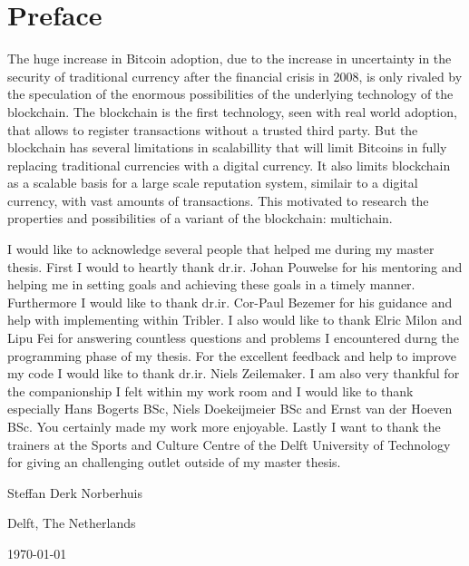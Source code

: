 \chapter*{Preface}
The huge increase in Bitcoin adoption, 
due to the increase in uncertainty in the security of traditional currency 
after the financial crisis in 2008, 
is only rivaled by the speculation of the enormous possibilities 
of the underlying technology of the blockchain.
The blockchain is the first technology, seen with real world adoption,
that allows to register transactions without a trusted third party.
But the blockchain has several limitations in scalabillity 
that will limit Bitcoins in fully replacing traditional currencies with a digital currency.
It also limits blockchain as a scalable basis for a large scale reputation system, 
similair to a digital currency, with vast amounts of transactions.
This motivated to research the properties and possibilities of a variant of the blockchain:
multichain.

\vspace{1\baselineskip}

\noindent
I would like to acknowledge several people that helped me during my master thesis.
First I would to heartly thank dr.ir. Johan Pouwelse for his mentoring and helping me in setting goals and achieving these goals in a timely manner.
Furthermore I would like to thank dr.ir. Cor-Paul Bezemer for his guidance and help with implementing within Tribler. 
I also would like to thank Elric Milon and Lipu Fei for answering countless questions and problems I encountered durng the programming phase of my thesis.
For the excellent feedback and help to improve my code I would like to thank dr.ir. Niels Zeilemaker.
I am also very thankful for the companionship I felt within my work room 
and I would like to thank especially Hans Bogerts BSc, Niels Doekeijmeier BSc and Ernst van der Hoeven BSc.
You certainly made my work more enjoyable.
Lastly I want to thank the trainers at the Sports and Culture Centre of the Delft University of Technology for giving an challenging outlet outside of my master thesis.

\vspace{1\baselineskip}

\noindent
Steffan Derk Norberhuis

\vspace{1\baselineskip}

\noindent
Delft, The Netherlands

\noindent
\today
